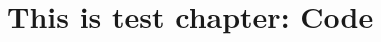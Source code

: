 \documentclass[12pt, a4paper, twoside]{report}
\begin{document}
\chapter{This is test chapter: Code}










\end{document}

